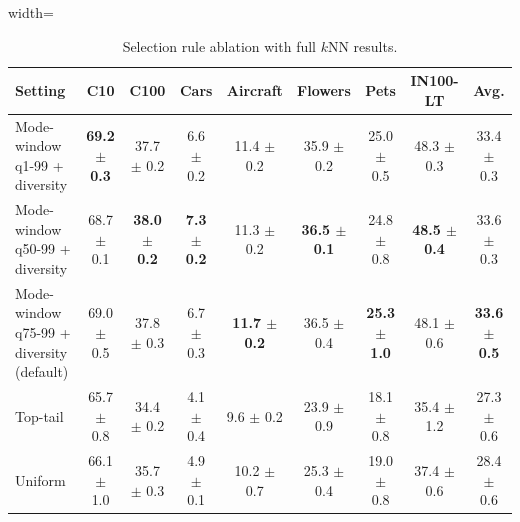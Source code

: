 \begin{table}[H]
\centering
\scriptsize
\setlength{\tabcolsep}{3.5pt}
\caption{Selection rule ablation with full $k$NN results.}
\label{tab:app_selection_knn}
\begin{adjustbox}{width=\textwidth}
\begin{tabular}{l c c c c c c c c}
\toprule
Setting & C10 & C100 & Cars & Aircraft & Flowers & Pets & IN100-LT & Avg. \\
\midrule
Mode-window q1-99 + diversity & \textbf{69.2 {\scriptsize$\pm$ 0.3}} & 37.7 {\scriptsize$\pm$ 0.2} & 6.6 {\scriptsize$\pm$ 0.2} & 11.4 {\scriptsize$\pm$ 0.2} & 35.9 {\scriptsize$\pm$ 0.2} & 25.0 {\scriptsize$\pm$ 0.5} & 48.3 {\scriptsize$\pm$ 0.3} & 33.4 {\scriptsize$\pm$ 0.3} \\
Mode-window q50-99 + diversity & 68.7 {\scriptsize$\pm$ 0.1} & \textbf{38.0 {\scriptsize$\pm$ 0.2}} & \textbf{7.3 {\scriptsize$\pm$ 0.2}} & 11.3 {\scriptsize$\pm$ 0.2} & \textbf{36.5 {\scriptsize$\pm$ 0.1}} & 24.8 {\scriptsize$\pm$ 0.8} & \textbf{48.5 {\scriptsize$\pm$ 0.4}} & 33.6 {\scriptsize$\pm$ 0.3} \\
Mode-window q75-99 + diversity (default) & 69.0 {\scriptsize$\pm$ 0.5} & 37.8 {\scriptsize$\pm$ 0.3} & 6.7 {\scriptsize$\pm$ 0.3} & \textbf{11.7 {\scriptsize$\pm$ 0.2}} & 36.5 {\scriptsize$\pm$ 0.4} & \textbf{25.3 {\scriptsize$\pm$ 1.0}} & 48.1 {\scriptsize$\pm$ 0.6} & \textbf{33.6 {\scriptsize$\pm$ 0.5}} \\
Top-tail & 65.7 {\scriptsize$\pm$ 0.8} & 34.4 {\scriptsize$\pm$ 0.2} & 4.1 {\scriptsize$\pm$ 0.4} & 9.6 {\scriptsize$\pm$ 0.2} & 23.9 {\scriptsize$\pm$ 0.9} & 18.1 {\scriptsize$\pm$ 0.8} & 35.4 {\scriptsize$\pm$ 1.2} & 27.3 {\scriptsize$\pm$ 0.6} \\
Uniform & 66.1 {\scriptsize$\pm$ 1.0} & 35.7 {\scriptsize$\pm$ 0.3} & 4.9 {\scriptsize$\pm$ 0.1} & 10.2 {\scriptsize$\pm$ 0.7} & 25.3 {\scriptsize$\pm$ 0.4} & 19.0 {\scriptsize$\pm$ 0.8} & 37.4 {\scriptsize$\pm$ 0.6} & 28.4 {\scriptsize$\pm$ 0.6} \\
\bottomrule
\end{tabular}
\end{adjustbox}
\end{table}
